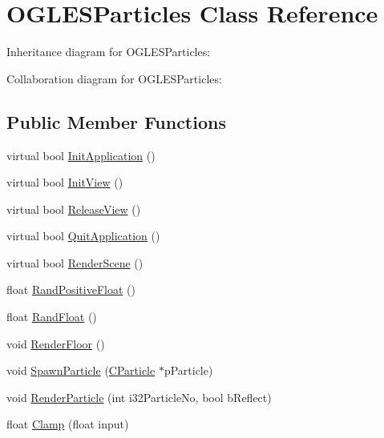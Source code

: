 \hypertarget{class_o_g_l_e_s_particles}{\section{O\+G\+L\+E\+S\+Particles Class Reference}
\label{class_o_g_l_e_s_particles}
}


Inheritance diagram for O\+G\+L\+E\+S\+Particles\+:


Collaboration diagram for O\+G\+L\+E\+S\+Particles\+:
\subsection*{Public Member Functions}
\begin{DoxyCompactItemize}
\item 
virtual bool \hyperlink{class_o_g_l_e_s_particles_a3e553e87e873122411213018fa38ff6a}{Init\+Application} ()
\item 
virtual bool \hyperlink{class_o_g_l_e_s_particles_ab08c8cf723fa1e2e516028b78d8cd9fd}{Init\+View} ()
\item 
virtual bool \hyperlink{class_o_g_l_e_s_particles_a18c86a4bddb919f8d35fa1761588d04a}{Release\+View} ()
\item 
virtual bool \hyperlink{class_o_g_l_e_s_particles_ab1c263e7ed2a727fcd29bf7522e06b53}{Quit\+Application} ()
\item 
virtual bool \hyperlink{class_o_g_l_e_s_particles_a0d6d20125a88c7534afdf8a1218b5079}{Render\+Scene} ()
\item 
float \hyperlink{class_o_g_l_e_s_particles_a7f5b19f2a598e9e7d9db9c16dbc5d384}{Rand\+Positive\+Float} ()
\item 
float \hyperlink{class_o_g_l_e_s_particles_aab6dd9b85edbfb08883afc8c2c8b7228}{Rand\+Float} ()
\item 
void \hyperlink{class_o_g_l_e_s_particles_aa095375eb1ea6046e4cfa4c58ef0edca}{Render\+Floor} ()
\item 
void \hyperlink{class_o_g_l_e_s_particles_aa35481641deea4ab08bbff056d6d56c1}{Spawn\+Particle} (\hyperlink{class_c_particle}{C\+Particle} $\ast$p\+Particle)
\item 
void \hyperlink{class_o_g_l_e_s_particles_a5c77a8e9ecd722a166ab68b7f3510e05}{Render\+Particle} (int i32\+Particle\+No, bool b\+Reflect)
\item 
float \hyperlink{class_o_g_l_e_s_particles_ae000b1df26a54e01b78eaf2a6b0d912c}{Clamp} (float input)
\end{DoxyCompactItemize}


